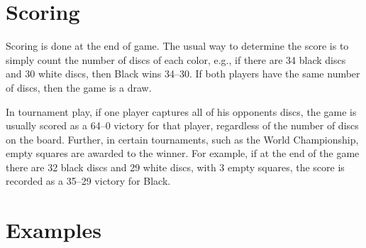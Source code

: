 \documentclass[a4paper,12pt]{book}
\begin{document}
\section{Scoring}

Scoring is done at the end of game. The usual way to determine the score is to
simply count the number of discs of each color, e.g., if there are 34 black discs and 30
white discs, then Black wins 34--30. If both players have the same number of discs,
then the game is a draw.

In tournament play, if one player captures all of his opponents discs, the game is
usually scored as a 64--0 victory for that player, regardless of the number of discs on
the board. Further, in certain tournaments, such as the World Championship, empty
squares are awarded to the winner. For example, if at the end of the game there are 32
black discs and 29 white discs, with 3 empty squares, the score is recorded as a 35--29
victory for Black.

\section{Examples}
\end{document}
